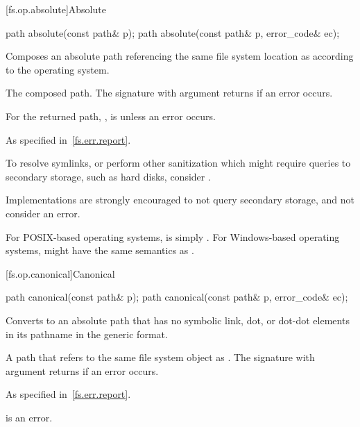 [fs.op.absolute]{Absolute}

%
\begin{itemdecl}
path absolute(const path& p);
path absolute(const path& p, error_code& ec);
\end{itemdecl}

\begin{itemdescr}
\pnum
\effects Composes an absolute path referencing the same file system location
as  according to the operating system.

\pnum
\returns The composed path.
The signature with argument  returns  if an error occurs.

\pnum
\begin{note}
For the returned path, ,  is 
unless an error occurs.
\end{note}

\pnum
\throws As specified in~\ref{fs.err.report}.

\pnum
\begin{note}
To resolve symlinks,
or perform other sanitization which might require queries to secondary storage,
such as hard disks, consider .
\end{note}

\pnum
\begin{note}
Implementations are strongly encouraged to not query secondary storage,
and not consider  an error.
\end{note}

\pnum
\begin{example}
For POSIX-based operating systems,
 is simply .
For Windows-based operating systems,
 might have the same semantics as .
\end{example}
\end{itemdescr}

[fs.op.canonical]{Canonical}

%
\begin{itemdecl}
path canonical(const path& p);
path canonical(const path& p, error_code& ec);
\end{itemdecl}

\begin{itemdescr}
\pnum
\effects Converts  to an absolute
path that has no symbolic link, dot, or dot-dot elements
in its pathname in the generic format.

\pnum
\returns A path that refers to
the same file system object as .
The signature with argument  returns  if an error occurs.

\pnum
\throws As specified in~\ref{fs.err.report}.

\pnum
\remarks {} is an error.
\end{itemdescr}

